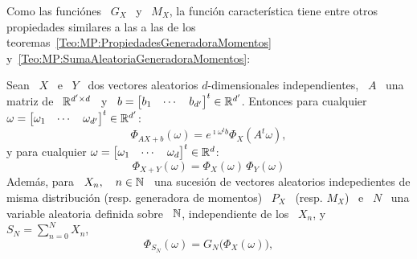 {Como las  funci\'ones \ $G_X$ \  y \ $M_X$, la  funci\'on caracter\'istica tiene
entre    otros    propiedades    similares     a    las    a    las    de    los
teoremas~\ref{Teo:MP:PropiedadesGeneradoraMomentos}
y~\ref{Teo:MP:SumaAleatoriaGeneradoraMomentos}:
%
\begin{teorema}%
\label{Teo:MP:PropiedadesFuncionCaracteristica}
%
  Sean  \   $X$  \  e  \   $Y$  \  dos   vectores  aleatorios  $d$-dimensionales
  independientes,  \ $A$  \ una  matriz de  \  $\mathbb{R}^{d' \times  d}$ \  y \  $b
  =  \begin{bmatrix} b_1  &  \cdots &  b_{d'}  \end{bmatrix}^t \in  \mathbb{R}^{d'}$.
  Entonces  para  cualquier  $\omega  =  \begin{bmatrix}  \omega_1  &  \cdots  &
    \omega_{d'} \end{bmatrix}^t \in \mathbb{R}^{d'}$:
  \[
  \Phi_{A X + b}(\omega) =  e^{\imath \omega^t b} \Phi_X\left( A^t \omega \right),
  \]
  y   para   cualquier  $\omega   =   \begin{bmatrix}   \omega_1   &  \cdots   &
    \omega_d \end{bmatrix}^t \in \mathbb{R}^d$:
  \[
  \Phi_{X+Y}(\omega) = \Phi_X(\omega) \, \Phi_Y(\omega)
  \]
  Adem\'as,  para \  $X_n, \quad  n  \in \mathbb{N}$  \, una  sucesi\'on de  vectores
  aleatorios  indepedientes  de   misma  distribuci\'on  (resp.   generadora  de
  momentos) \ $P_X$ \ (resp. $M_X$) \  e \ $N$ \ una variable aleatoria definida
  sobre \ $\mathbb{N}$, independiente de los \ $X_n$, y \ $ S_N = \sum_{n=0}^N X_n$,
  \[
  \Phi_{S_N}(\omega) =  G_N \big( \Phi_X(\omega) \big),
  \]
\end{teorema}

}
